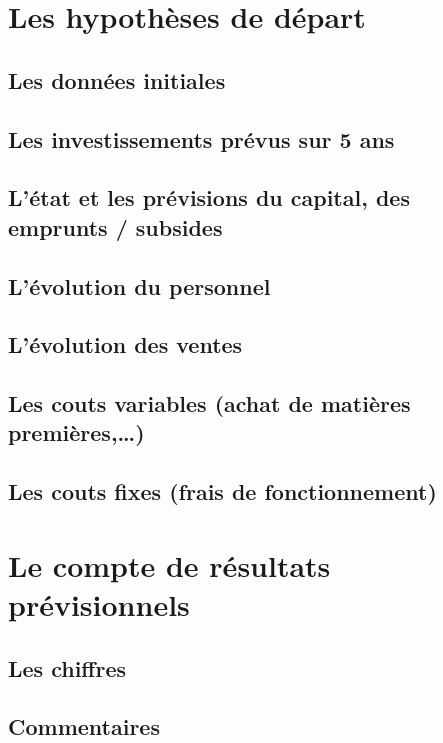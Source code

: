 \documentclass[a4paper]{report}
\begin{document}
\section{Les hypothèses de départ}

\subsection{Les données initiales}

\subsection{Les investissements prévus sur 5 ans}

\subsection{L’état et les prévisions du capital, des emprunts / subsides}

\subsection{L’évolution du personnel}

\subsection{L’évolution des ventes}

\subsection{Les couts variables (achat de matières premières,\ldots)}

\subsection{Les couts fixes (frais de fonctionnement)}

\section{Le compte de résultats prévisionnels}

\subsection{Les chiffres}

\subsection{Commentaires}
\end{document}
